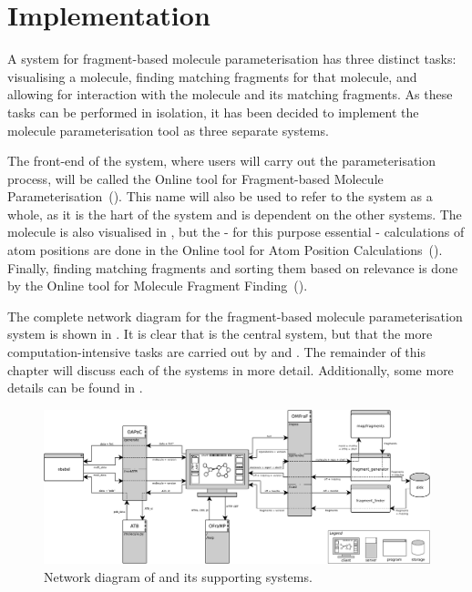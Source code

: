 \chapter{Implementation}


\setcounter{topnumber}{1}
\setcounter{bottomnumber}{1}
\setlength{\textfloatsep}{1em}
\renewcommand{\topfraction}{0.9}
\renewcommand{\bottomfraction}{0.9}
\renewcommand{\textfraction}{0.1}


A system for fragment-based molecule parameterisation has three distinct tasks: visualising a molecule, finding matching fragments for that molecule, and allowing for interaction with the molecule and its matching fragments. As these tasks can be performed in isolation, it has been decided to implement the molecule parameterisation tool as three separate systems.

The front-end of the system, where users will carry out the parameterisation process, will be called the Online tool for Fragment-based Molecule Parameterisation~(\oframp). This name will also be used to refer to the system as a whole, as it is the hart of the system and is dependent on the other systems. The molecule is also visualised in \oframp, but the - for this purpose essential - calculations of atom positions are done in the Online tool for Atom Position Calculations~(\oapoc). Finally, finding matching fragments and sorting them based on relevance is done by the Online tool for Molecule Fragment Finding~(\omfraf).

The complete network diagram for the fragment-based molecule parameterisation system is shown in . It is clear that \oframp{} is the central system, but that the more computation-intensive tasks are carried out by \oapoc{} and \omfraf{}. The remainder of this chapter will discuss each of the systems in more detail. Additionally, some more details can be found in .


\begin{figure}
\center
\includegraphics[width=\textwidth]{img/network_diagram.pdf}
\vspace{1em}
\caption{Network diagram of \oframp{} and its supporting systems.}
\end{figure}


